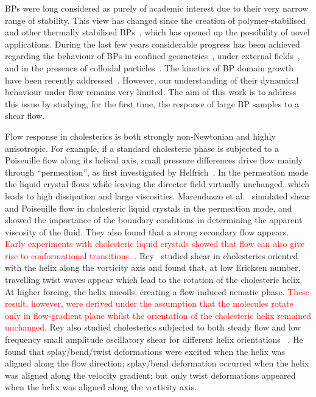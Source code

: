 \documentclass[8.5pt,twoside,twocolumn]{article}
\newcommand{\rev}[1]{{\textcolor{red}{#1}}}
\begin{document}
BPs were long considered as purely of academic interest due to their very narrow 
range of stability. This view has changed since the creation of polymer-stabilised and other thermally 
stabilised BPs~\cite{Kikuchi:2002,Coles:2005}, which has opened up the 
possibility of novel applications.
During the last few years considerable progress has been achieved regarding the behaviour 
of BPs in confined geometries~\cite{Fukuda:2010a, Fukuda:2010b, Ravnik:2011b}, under 
external fields~\cite{Alexander:2008,Fukuda:2009,Henrich:2010a,Castles:2010,Tiribocchi:2011a}, 
and in the presence of colloidal particles~\cite{Ravnik:2011a}.
The kinetics of BP domain growth have been recently addressed~\cite{Henrich:2010b}. 
However, our understanding of their dynamical behaviour under flow remains
very limited. The aim of this work is to address this issue by studying,
for the first time, the response of large BP samples to a shear flow.

Flow response in cholesterics is both strongly non-Newtonian and highly anisotropic.
For example, if a standard cholesteric phase is subjected to a Poiseuille flow along
its helical axis, small pressure differences drive flow mainly through
``permeation'', as first investigated by Helfrich~\cite{Helfrich:1969}.
In the permeation mode the liquid crystal flows while leaving the director
field virtually unchanged, which leads to high dissipation and large
viscosities. Marenduzzo et al.~\cite{Marenduzzo:2006a,Marenduzzo:2006b} simulated 
shear and Poiseuille flow in cholesteric liquid crystals in the permeation mode, and 
showed the importance of the boundary conditions in determining the apparent viscosity of the fluid. 
They also found that a strong secondary flow appears.
\rev{Early experiments with cholesteric liquid crystals
showed that flow can also give rise to conformational transitions. \cite{Press:1978}.}
Rey~\cite{Rey:1996a, Rey:1996b} studied shear in cholesterics oriented with the helix along 
the vorticity axis and found that, at low Ericksen number, travelling twist waves appear which 
lead to the rotation of the cholesteric helix. At higher forcing, the helix uncoils, creating a flow-induced nematic phase. \rev{These result, however, were derived under the 
assumption that the molecules rotate only in flow-gradient plane whilst
the orientation of the cholesteric helix remained unchanged.}  
Rey also studied cholesterics subjected to both steady flow and low frequency
small amplitude oscillatory shear for different helix orientations
~\cite{Rey:2000, Rey:2002}. He found that splay/bend/twist deformations were
excited when the helix was aligned along the flow direction; splay/bend
deformation occurred when the helix was aligned along the velocity gradient;
but only twist deformations
appeared when the helix was aligned along the vorticity axis.
\end{document}
